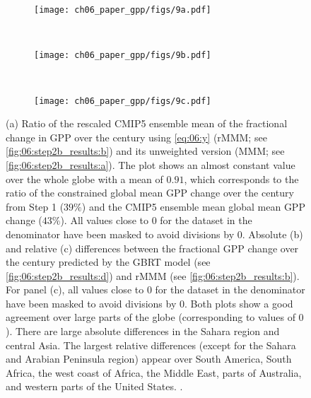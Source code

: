 \begin{figure}[!t]
  \centering
  \begin{subfigure}[b]{\SubfigureWidth{}}
    \texttt{[image: ch06\_paper\_gpp/figs/9a.pdf]}
    \caption{}
    \label{fig:06:step2b_results_biases:a}
  \end{subfigure}
  \\
  \begin{subfigure}[b]{\SubfigureWidth{}}
    \texttt{[image: ch06\_paper\_gpp/figs/9b.pdf]}
    \caption{}
    \label{fig:06:step2b_results_biases:b}
  \end{subfigure}
  ~
  \begin{subfigure}[b]{\SubfigureWidth{}}
    \texttt{[image: ch06\_paper\_gpp/figs/9c.pdf]}
    \caption{}
    \label{fig:06:step2b_results_biases:c}
  \end{subfigure}
  \caption[
    Further illustrations of our \acl{ML} approach to constrain the fractional
    change in \acf{GPP} over the  century with observations in Step 2b.
  ]{
    (a) Ratio of the rescaled \acs{CMIP}5 ensemble mean of the fractional
    change in \acf{GPP} over the  century using \cref{eq:06:y}
    (r\acs{MMM}; see \cref{fig:06:step2b_results:b}) and its unweighted version
    (\acs{MMM}; see \cref{fig:06:step2b_results:a}). The plot shows an almost
    constant value over the whole globe with a mean of $0.91$, which
    corresponds to the ratio of the constrained global mean \acs{GPP} change
    over the  century from Step 1 ($39 \unit{\%}$) and the \acs{CMIP}5
    ensemble mean global mean GPP change ($43 \unit{\%}$). All values close to
    $0$ for the dataset in the denominator have been masked to avoid divisions
    by $0$. Absolute (b) and relative (c) differences between the fractional
    \acs{GPP} change over the  century predicted by the \acf{GBRT}
    model (see \cref{fig:06:step2b_results:d}) and r\acs{MMM} (see
    \cref{fig:06:step2b_results:b}). For panel (c), all values close to $0$ for
    the dataset in the denominator have been masked to avoid divisions by $0$.
    Both plots show a good agreement over large parts of the globe
    (corresponding to values of $0$). There are large absolute differences in
    the Sahara region and central Asia. The largest relative differences
    (except for the Sahara and Arabian Peninsula region) appear over South
    America, South Africa, the west coast of Africa, the Middle East, parts of
    Australia, and western parts of the United States.
    .
  }
  \label{fig:06:step2b_results_biases}
\end{figure}


